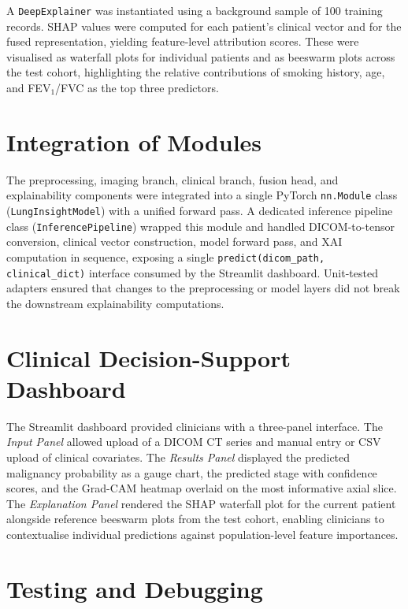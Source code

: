 {A \texttt{DeepExplainer} was instantiated using a background sample of 100 training records.
SHAP values were computed for each patient's clinical vector and for the fused representation,
yielding feature-level attribution scores. These were visualised as waterfall plots for
individual patients and as beeswarm plots across the test cohort, highlighting the relative
contributions of smoking history, age, and FEV$_1$/FVC as the top three predictors.

\section{Integration of Modules}

The preprocessing, imaging branch, clinical branch, fusion head, and explainability components
were integrated into a single PyTorch \texttt{nn.Module} class (\texttt{LungInsightModel})
with a unified forward pass. A dedicated inference pipeline class (\texttt{InferencePipeline})
wrapped this module and handled DICOM-to-tensor conversion, clinical vector construction,
model forward pass, and XAI computation in sequence, exposing a single
\texttt{predict(dicom\_path, clinical\_dict)} interface consumed by the Streamlit dashboard.
Unit-tested adapters ensured that changes to the preprocessing or model layers did not break
the downstream explainability computations.

\section{Clinical Decision-Support Dashboard}

The Streamlit dashboard provided clinicians with a three-panel interface. The \textit{Input
Panel} allowed upload of a DICOM CT series and manual entry or CSV upload of clinical
covariates. The \textit{Results Panel} displayed the predicted malignancy probability as a
gauge chart, the predicted stage with confidence scores, and the Grad-CAM heatmap overlaid on
the most informative axial slice. The \textit{Explanation Panel} rendered the SHAP waterfall
plot for the current patient alongside reference beeswarm plots from the test cohort, enabling
clinicians to contextualise individual predictions against population-level feature
importances.

\section{Testing and Debugging}

}
